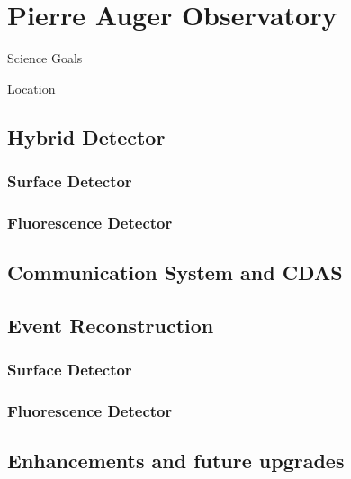 \chapter{Pierre Auger Observatory}\label{Ch:PAO}


Science Goals

Location

\section{Hybrid Detector}

\subsection{Surface Detector}

\subsection{Fluorescence Detector}

\section{Communication System and CDAS}

\section{Event Reconstruction}

\subsection{Surface Detector}

\subsection{Fluorescence Detector}

\section{Enhancements and future upgrades}